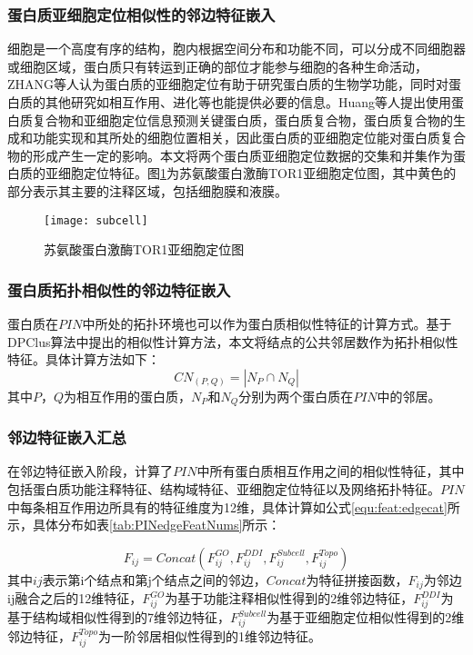 \subsubsection{蛋白质亚细胞定位相似性的邻边特征嵌入}

细胞是一个高度有序的结构，胞内根据空间分布和功能不同，可以分成不同细胞器或细胞区域，蛋白质只有转运到正确的部位才能参与细胞的各种生命活动，ZHANG等人\cite{zhang_protein_2007}认为蛋白质的亚细胞定位有助于研究蛋白质的生物学功能，同时对蛋白质的其他研究如相互作用、进化等也能提供必要的信息。Huang等人提出\cite{fan_genome-wide_2017}使用蛋白质复合物和亚细胞定位信息预测关键蛋白质，蛋白质复合物，蛋白质复合物的生成和功能实现和其所处的细胞位置相关，因此蛋白质的亚细胞定位能对蛋白质复合物的形成产生一定的影响。本文将两个蛋白质亚细胞定位数据的交集和并集作为蛋白质的亚细胞定位特征。图\ref{fig:subcell}为苏氨酸蛋白激酶TOR1亚细胞定位图，其中黄色的部分表示其主要的注释区域，包括细胞膜和液膜。

\begin{figure}[htbp]
    \centering
    \texttt{[image: subcell]}
    \caption{苏氨酸蛋白激酶TOR1亚细胞定位图\cite{fan_genome-wide_2017}}
    \label{fig:subcell}
\end{figure}

\subsubsection{蛋白质拓扑相似性的邻边特征嵌入}

蛋白质在$PIN$中所处的拓扑环境也可以作为蛋白质相似性特征的计算方式。基于DPClus算法\cite{altaf-ul-amin_development_2006}中提出的相似性计算方法，本文将结点的公共邻居数作为拓扑相似性特征。具体计算方法如下：
\begin{equation}
    \label{equ:feat:topoCN}
    CN_{(P,Q)} = \left\lvert N_P\cap N_Q\right\rvert
\end{equation}
其中$P$，$Q$为相互作用的蛋白质，$N_P$和$N_Q$分别为两个蛋白质在$PIN$中的邻居。

\subsubsection{邻边特征嵌入汇总}

在邻边特征嵌入阶段，计算了$PIN$中所有蛋白质相互作用之间的相似性特征，其中包括蛋白质功能注释特征、结构域特征、亚细胞定位特征以及网络拓扑特征。$PIN$中每条相互作用边所具有的特征维度为12维，具体计算如公式\ref{equ:feat:edgecat}所示，具体分布如表\ref{tab:PINedgeFeatNums}所示：

\begin{equation}
    \label{equ:feat:edgecat}
    F_{ij}=Concat(F_{ij}^{GO},F_{ij}^{DDI},F_{ij}^{Subcell},F_{ij}^{Topo})
\end{equation}
其中${ij}$表示第i个结点和第j个结点之间的邻边，$Concat$为特征拼接函数，$F_{ij}$为邻边ij融合之后的12维特征，$F_{ij}^{GO}$为基于功能注释相似性得到的2维邻边特征，$F_{ij}^{DDI}$为基于结构域相似性得到的7维邻边特征，$F_{ij}^{Subcell}$为基于亚细胞定位相似性得到的2维邻边特征，$F_{ij}^{Topo}$为一阶邻居相似性得到的1维邻边特征。

